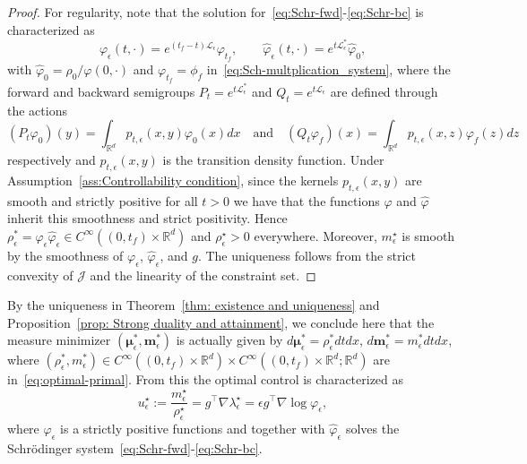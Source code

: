 \documentclass{amsart}
\numberwithin{equation}{section}
\newcommand{\R}{\mathbb{R}}
\begin{document}
\begin{proof}
For regularity, note that the solution for~\eqref{eq:Schr-fwd}-\eqref{eq:Schr-bc} is characterized as
\[
\varphi_\epsilon(t,\cdot) = e^{(t_f-t)\mathcal{L}_\epsilon}\varphi_{t_f}, \qquad 
\hat{\varphi}_\epsilon(t,\cdot) = e^{t\mathcal{L}_\epsilon^*}\hat{\varphi}_0,
\]
with $\hat{\varphi}_0 = \rho_0 / \varphi(0,\cdot)$ and $\varphi_{t_f}=\phi_f$ in~\eqref{eq:Sch-multplication_system},  where the forward and backward semigroups $P_t = e^{t\mathcal{L}_\epsilon^*}$ and $
Q_t = e^{t\mathcal{L}_\epsilon}$ are defined through the actions
\begin{equation}\label{eq: action_semigroup}
(P_t \varphi_0)(y) = \int_{\R^d} p_{t,\epsilon}(x,y) \varphi_0(x)   dx\quad\text{and}\quad (Q_t \varphi_f)(x) = \int_{\R^d} p_{t,\epsilon}(x,z) \varphi_f(z)   dz    
\end{equation}
respectively and $p_{t,\epsilon}(x,y)$ is the transition density function. Under Assumption~\ref{ass:Controllability condition}, since the kernels $p_{t,\epsilon}(x,y)$ are smooth and strictly positive for all $t>0$ we have that the functions $\varphi$ and $\hat{\varphi}$  inherit this smoothness and strict positivity. Hence $\rho_\epsilon^* = \varphi_\epsilon\hat{\varphi}_\epsilon \in C^\infty((0,t_f)\times\R^d)$ and $\rho_{\epsilon}^\star > 0$ everywhere. Moreover, $m_{\epsilon}^\star$ is smooth by the smoothness of $\varphi_\epsilon$, $\hat{\varphi}_\epsilon$, and $g$. The uniqueness follows from the strict convexity of $\mathcal{J}$ and the linearity of the constraint set.
\end{proof}
By the uniqueness in Theorem~\ref{thm: existence and uniqueness} and Proposition~\ref{prop: Strong duality and attainment}, we conclude here that the measure minimizer $(\boldsymbol{\mu}_{\epsilon}^*, \mathbf{m}_{\epsilon}^*)$ is actually given by $d\boldsymbol{\mu}_{\epsilon}^* = \rho_{\epsilon}^* dt dx$, $d\mathbf{m}_{\epsilon}^* = m_{\epsilon}^* dt dx$, where $(\rho_{\epsilon}^*,m_{\epsilon}^*)\in C^\infty((0,t_f)\times\R^d)\times C^\infty((0,t_f)\times\R^d;\R^d)$ are in~\eqref{eq:optimal-primal}. From this the optimal control is characterized as
\begin{equation}\label{eq:optimal-control}
u_\epsilon^\star:=\frac{m_{\epsilon}^\star}{\rho_{\epsilon}^\star}=g^\top\nabla\lambda_{\epsilon}^\star=\epsilon  g^\top\nabla\log\varphi_{\epsilon},
\end{equation}
where $\varphi_{\epsilon}$ is a strictly positive functions and together with $\hat\varphi_{\epsilon}$ solves the Schr\"odinger system~\eqref{eq:Schr-fwd}-\eqref{eq:Schr-bc}.
\end{document}

